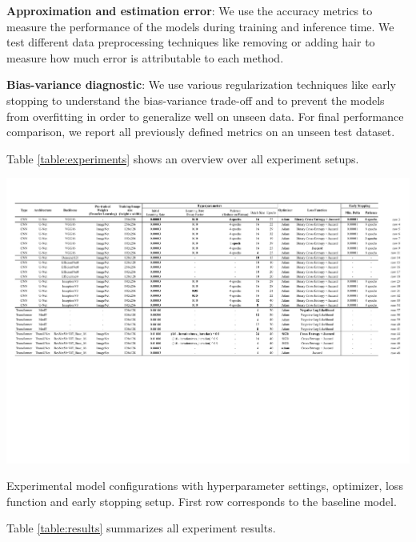 \textbf{Approximation and estimation error}: We use the accuracy metrics to measure the performance of the models during training and inference time. We test different data preprocessing techniques like removing or adding hair to measure how much error is attributable to each method.

\textbf{Bias-variance diagnostic}: We use various regularization techniques like early stopping to understand the bias-variance trade-off and to prevent the models from overfitting in order to generalize well on unseen data. For final performance comparison, we report all previously defined metrics on an unseen test dataset.

\par
Table \ref{table:experiments} shows an overview over all experiment setups.

\begin{table}[ht]
\centering
\includegraphics[width=\textwidth]{assets/experiments.pdf}
\caption[Experiments]{Experimental model configurations with hyperparameter settings, optimizer, loss function and early stopping setup. First row corresponds to the baseline model.}
\label{table:experiments}
\end{table}

\par
Table \ref{table:results} summarizes all experiment results.


